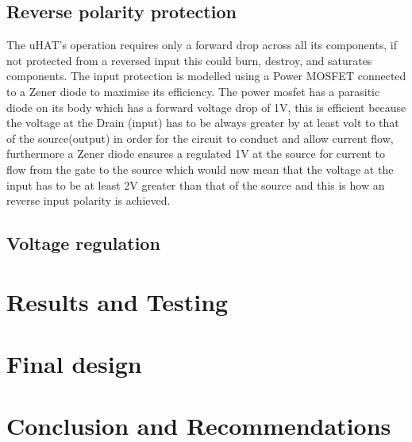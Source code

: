 \documentclass[class=report,11pt,crop=false]{standalone}
\begin{document}
	\subsection{Reverse polarity protection}
	\vspace{0.5cm}
	The uHAT’s operation requires only a forward drop across all its components, if not
	protected from a reversed input this could burn, destroy, and saturates components. The
	input protection is modelled using a Power MOSFET connected to a Zener diode to
	maximise its efficiency. The power mosfet has a parasitic diode on its body which has a
	forward voltage drop of 1V, this is efficient because the voltage at the Drain (input) has to be
	always greater by at least volt to that of the source(output) in order for the circuit to conduct
	and allow current flow, furthermore a Zener diode ensures a regulated 1V at the source for
	current to flow from the gate to the source which would now mean that the voltage at the
	input has to be at least 2V greater than that of the source and this is how an reverse input
	polarity is achieved.

	\subsection{Voltage regulation}
	\section{Results and Testing}
	\section{Final design}
	\section{Conclusion and Recommendations}
	
\end{document}
